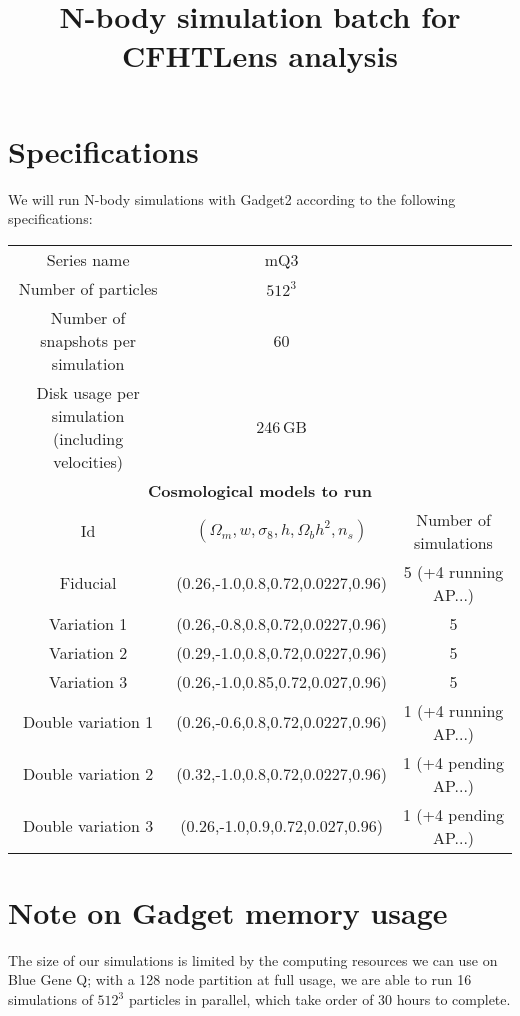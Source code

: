 \documentclass[11pt]{article}
\begin{document}
\title{N-body simulation batch for CFHTLens analysis}
\author{}
\date{}

\maketitle

\section*{Specifications}

We will run N-body simulations with Gadget2 according to the following specifications:

\begin{table}[h!]
\begin{center}
\begin{tabular}{ccc} \hline
Series name & mQ3 & \\
Number of particles & $512^3$ & \\ 
Number of snapshots per simulation & 60 & \\
Disk usage per simulation (including velocities) & 246\,GB& \\ \hline
\multicolumn{3}{c}{\textbf{Cosmological models to run}} \\
Id & $(\Omega_m,w,\sigma_8,h,\Omega_bh^2,n_s)$ & Number of simulations\\ \hline
Fiducial & (0.26,-1.0,0.8,0.72,0.0227,0.96) & 5 (+4 running AP...) \\
Variation 1 & (0.26,-0.8,0.8,0.72,0.0227,0.96) & 5 \\
Variation 2 & (0.29,-1.0,0.8,0.72,0.0227,0.96) & 5 \\
Variation 3 & (0.26,-1.0,0.85,0.72,0.027,0.96) & 5 \\ \hline
Double variation 1 & (0.26,-0.6,0.8,0.72,0.0227,0.96) & 1 (+4 running AP...) \\
Double variation 2 & (0.32,-1.0,0.8,0.72,0.0227,0.96) & 1 (+4 pending AP...) \\
Double variation 3 & (0.26,-1.0,0.9,0.72,0.027,0.96) & 1 (+4 pending AP...) \\ \hline
\end{tabular}
\end{center}
\end{table}

\section*{Note on Gadget memory usage}
The size of our simulations is limited by the computing resources we can use on Blue Gene Q; with a 128 node partition at full usage, we are able to run 16 simulations of $512^3$ particles in parallel, which take order of 30 hours to complete. 
\end{document}
